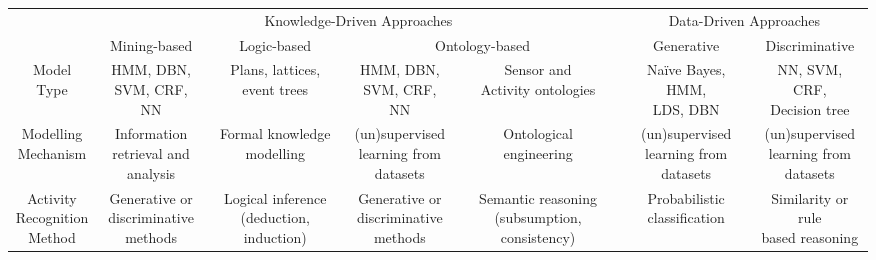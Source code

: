 \begin{sidewaystable}[htbp]\scriptsize
    \begin{center}    
        \begin{tabular}{ccccccc}
            \hline            
             & \multicolumn{4}{c}{Knowledge-Driven Approaches} & \multicolumn{2}{c}{Data-Driven Approaches} \\
             & Mining-based & Logic-based & \multicolumn{2}{c}{Ontology-based} & Generative & Discriminative \\             
            \hline
            Model Type   & \specialcell{HMM, DBN,\\SVM, CRF, NN} & \specialcell{Plans, lattices,\\event trees} & \specialcell{HMM, DBN,\\SVM, CRF, NN} & \specialcell{Sensor and\\Activity ontologies} & \specialcell{Na\"ive Bayes, HMM,\\LDS, DBN} & \specialcell{NN, SVM, CRF,\\Decision tree}  \\
            \hline
	    \specialcell{Modelling\\Mechanism} & \specialcell{Information\\retrieval and\\analysis} & \specialcell{Formal knowledge\\modelling} & \specialcell{(un)supervised\\learning from\\datasets} & \specialcell{Ontological\\engineering} & \specialcell{(un)supervised\\learning from\\datasets} & \specialcell{(un)supervised\\learning from\\datasets}\\
	    \hline
	    \specialcell{Activity\\Recognition\\Method} & \specialcell{Generative or\\discriminative\\methods} & \specialcell{Logical inference\\(deduction, induction)} & \specialcell{Generative or\\discriminative\\methods} & \specialcell{Semantic reasoning\\(subsumption, consistency)} & \specialcell{Probabilistic\\classification} & \specialcell{Similarity or rule\\based reasoning}\\

\end{tabular}
\end{center}
\end{sidewaystable}
